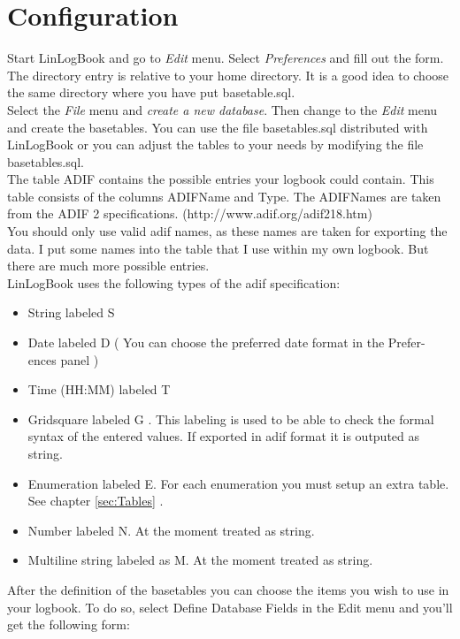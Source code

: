 \documentclass[a4paper,11pt]{article}
\begin{document}
\section{Configuration}\label{sec:Configuration} 
Start LinLogBook and go to \textit{Edit} menu. Select \textit{Preferences} and fill out the
form. The directory entry is relative to your home directory. It is a good idea
to choose the same directory where you have put basetable.sql.\\
Select the \textit{File} menu and \textit{create a new database}. Then change to the \textit{Edit} menu
and create the basetables. You can use the file basetables.sql distributed with
LinLogBook or you can adjust the tables to your needs by modifying the file
basetables.sql.\\
The table ADIF contains the possible entries your logbook could contain. This
table consists of the columns ADIFName and Type. The ADIFNames are
taken from the ADIF 2 specifications. (http://www.adif.org/adif218.htm)\\
You should only use valid adif names, as these names are taken for exporting the
data. I put some names into the table that I use within my own logbook. But
there are much more possible entries.\\

LinLogBook uses the following types of the adif specification:
\begin{itemize}
  \item String labeled S
  \item Date labeled D ( You can choose the preferred date format in the Prefer-
ences panel )
\item Time (HH:MM) labeled T
\item Gridsquare labeled G . This labeling is used to be able to check the formal
syntax of the entered values. If exported in adif format it is outputed as
string.
\item Enumeration labeled E. For each enumeration you must setup an extra
table. See chapter \ref{sec:Tables} .
\item Number labeled N. At the moment treated as string.
\item Multiline string labeled as M. At the moment treated as string.
\end{itemize}
After the definition of the basetables you can choose the items you wish to use
in your logbook.
To do so, select Define Database Fields in the Edit menu and you’ll get the
following form:\\
\end{document}
